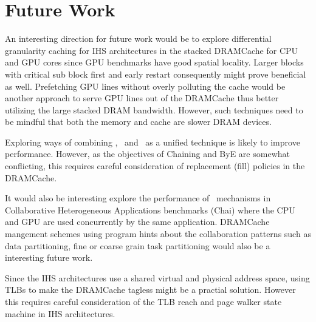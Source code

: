 \section{Future Work}
An interesting direction for future work would be to explore differential granularity caching for IHS architectures in the stacked DRAMCache for CPU and GPU cores since GPU benchmarks have good spatial locality. Larger blocks with critical sub block first and early restart \cite{dram-book} consequently might prove beneficial as well. Prefetching GPU lines without overly polluting the cache would be another approach to serve GPU lines out of the DRAMCache thus better utilizing the large stacked DRAM bandwidth. However, such techniques need to be mindful that both the memory and cache are slower DRAM devices. 
\par Exploring ways of combining \prioname, \chaining\ and \bypassname\ as a unified technique is likely to improve performance. However, as the objectives of Chaining and ByE are somewhat conflicting, this requires careful consideration of replacement (fill) policies in the DRAMCache.
\par It would also be interesting explore the performance of \cachename\ mechanisms in Collaborative Heterogeneous Applications benchmarks (Chai) \cite{chai} where the CPU and GPU are used concurrently by the same application. DRAMCache mangement schemes using program hints about the collaboration patterns such as data partitioning, fine or coarse grain task partitioning would also be a interesting future work.
\par Since the IHS architectures use a shared virtual and physical address space, using TLBs to make the DRAMCache tagless might be a practial solution. However this requires careful consideration of the TLB reach and page walker state machine in IHS architectures.

